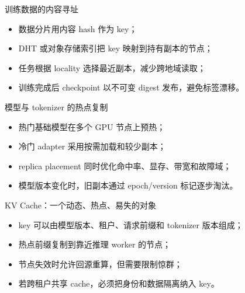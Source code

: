 \documentclass[UTF8,fontset=none,aspectratio=169,10pt]{beamer}
\begin{document}

\begin{frame}{训练数据的内容寻址}
\begin{itemize}
  \item 数据分片用内容 hash 作为 key；
  \item DHT 或对象存储索引把 key 映射到持有副本的节点；
  \item 任务根据 locality 选择最近副本，减少跨地域读取；
  \item 训练完成后 checkpoint 以不可变 digest 发布，避免标签漂移。
\end{itemize}
\vfill
{}
\end{frame}

\begin{frame}{模型与 tokenizer 的热点复制}
\begin{itemize}
  \item 热门基础模型在多个 GPU 节点上预热；
  \item 冷门 adapter 采用按需加载和较少副本；
  \item replica placement 同时优化命中率、显存、带宽和故障域；
  \item 模型版本变化时，旧副本通过 epoch/version 标记逐步淘汰。
\end{itemize}
\end{frame}

\begin{frame}{KV Cache：一个动态、热点、易失的对象}
\begin{itemize}
  \item key 可以由模型版本、租户、请求前缀和 tokenizer 版本组成；
  \item 热点前缀复制到靠近推理 worker 的节点；
  \item 节点失效时允许回源重算，但需要限制惊群；
  \item 若跨租户共享 cache，必须把身份和数据隔离纳入 key。
\end{itemize}
\end{frame}
\end{document}
